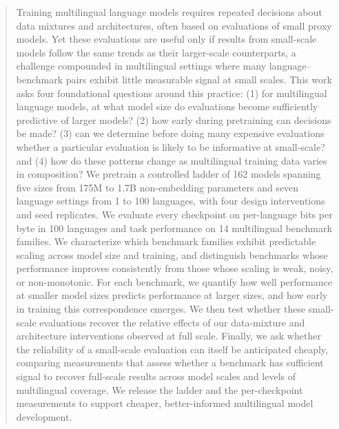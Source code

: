 \begin{abstract}
Training multilingual language models requires repeated decisions about data mixtures and architectures, often based on evaluations of small proxy models.
Yet these evaluations are useful only if results from small-scale models follow the same trends as their larger-scale counterparts, a challenge compounded in multilingual settings where many language–benchmark pairs exhibit little measurable signal at small scales.
This work asks four foundational questions around this practice: (1) for multilingual language models, at what model size do evaluations become sufficiently predictive of larger models? (2) how early during pretraining can decisions be made? (3) can we determine before doing many expensive evaluations whether a particular evaluation is likely to be informative at small-scale? and (4) how do these patterns change as multilingual training data varies in composition? 
We pretrain a controlled ladder of 162 models spanning five sizes from 175M to 1.7B non-embedding parameters and seven language settings from 1 to 100 languages, with four design interventions and seed replicates. 
We evaluate every checkpoint on per-language bits per byte in 100 languages and task performance on 14 multilingual benchmark families.
We characterize which benchmark families exhibit predictable scaling across model size and training, and distinguish benchmarks whose performance improves consistently from those whose scaling is weak, noisy, or non-monotonic. 
For each benchmark, we quantify how well performance at smaller model sizes predicts performance at larger sizes, and how early in training this correspondence emerges. We then test whether these small-scale evaluations recover the relative effects of our data-mixture and architecture interventions observed at full scale.
Finally, we ask whether the reliability of a small-scale evaluation can itself be anticipated cheaply, comparing measurements that assess whether a benchmark has sufficient signal to recover full-scale results across model scales and levels of multilingual coverage. 
We release the ladder and the per-checkpoint measurements to support cheaper, better-informed multilingual model development.
\end{abstract}

